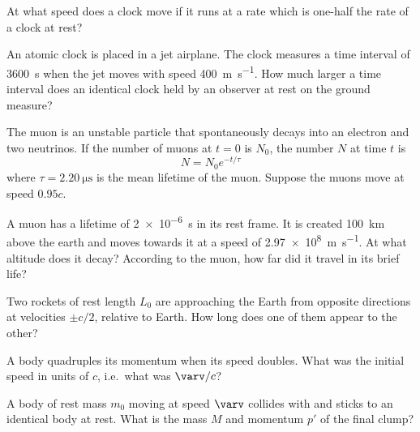 \documentclass{../../../oss-ap12ibhl}
\begin{document}
\genheader
{}


\begin{questions}
  \question At what speed does a clock move if it runs at a rate which is
  one-half the rate of a clock at rest?

  \question An atomic clock is placed in a jet airplane. The clock measures a
  time interval of \SI{3600}{\second} when the jet moves with speed
  \SI{400}{\metre\per\second}. How much larger a time interval does an
  identical clock held by an observer at rest on the ground measure?

  \question The muon is an unstable particle that spontaneously decays into an
  electron and two neutrinos. If the number of muons at $t=0$ is $N_0$, the
  number $N$ at time $t$ is
  \begin{equation*}
    N = N_0 e^{-t/\tau}
  \end{equation*}
  where $\tau=\SI{2.20}{\micro\second}$ is the mean lifetime of the muon.
  Suppose the muons move at speed $0.95c$.
  \newpage

  \question A muon has a lifetime of \SI{2e-6}{\second} in its rest frame. It
  is created \SI{100}{\kilo\metre} above the earth and moves towards it at
  a speed of \SI{2.97e8}{\metre\per\second}. At what altitude does it decay?
  According to the muon, how far did it travel in its brief life?
  
  \question Two rockets of rest length $L_0$ are approaching the Earth from
  opposite directions at velocities $\pm c/2$, relative to Earth. How long does
  one of them appear to the other?

  \question A body quadruples its momentum when its speed doubles. What was the
  initial speed in units of $c$, i.e.\ what was $\varv/c$?
  \newpage

  \question A body of rest mass $m_0$ moving at speed $\varv$ collides with and
  sticks to an identical body at rest. What is the mass $M$ and momentum
  $p'$ of the final clump?


\end{questions}
\end{document}

